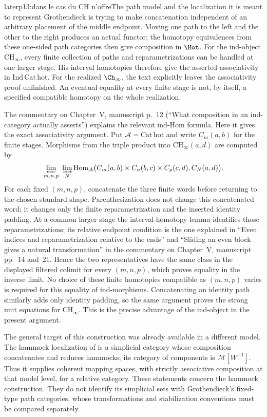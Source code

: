 \begin{dcomment}{later}{p13:dans le cas du CH n'offre}{The path model and the localization it is meant to represent}
Grothendieck is trying to make concatenation independent of an arbitrary placement of the middle endpoint. Moving one path to the left and the other to the right produces an actual functor; the homotopy equivalences from these one-sided path categories then give composition in $\Hot$. For the ind-object $\mathrm{CH}_\infty$, every finite collection of paths and reparametrizations can be handled at one larger stage. His interval homotopies therefore give the asserted associativity in $\mathrm{Ind\,Cat\,hot}$. For the realized $\Ch_\infty$, the text explicitly leaves the associativity proof unfinished. An eventual equality at every finite stage is not, by itself, a specified compatible homotopy on the whole realization.

The commentary on Chapter~V, manuscript p.~12 (``What composition in an ind-category actually asserts'') explains the relevant ind-Hom formula. Here it gives the exact associativity argument. Put $\mathcal A=\mathrm{Cat\,hot}$ and write $C_m(a,b)$ for the finite stages. Morphisms from the triple product into $\mathrm{CH}_\infty(a,d)$ are computed by
\[
 \varprojlim_{m,n,p}\ \varinjlim_N
 \operatorname{Hom}_{\mathcal A}\bigl(
 C_m(a,b)\times C_n(b,c)\times C_p(c,d),C_N(a,d)\bigr).
\]
For each fixed $(m,n,p)$, concatenate the three finite words before returning to the chosen standard shape. Parenthesization does not change this concatenated word; it changes only the finite reparametrization and the inserted identity padding. At a common larger stage the interval-homotopy lemma identifies those reparametrizations; its relative endpoint condition is the one explained in ``Even indices and reparametrization relative to the ends'' and ``Sliding an even block gives a natural transformation'' in the commentary on Chapter~V, manuscript pp.~14 and~21. Hence the two representatives have the same class in the displayed filtered colimit for every $(m,n,p)$, which proves equality in the inverse limit. No choice of these finite homotopies compatible as $(m,n,p)$ varies is required for this equality of ind-morphisms. Concatenating an identity path similarly adds only identity padding, so the same argument proves the strong unit equations for $\mathrm{CH}_\infty$. This is the precise advantage of the ind-object in the present argument.

The general target of this construction was already available in a different model. The hammock localization of \citet[\S2; Propositions 2.2 and 3.1]{DwyerKan1980Calculating} is a simplicial category whose composition concatenates and reduces hammocks; its category of components is $\mathcal M[W^{-1}]$. Thus it supplies coherent mapping spaces, with strictly associative composition at that model level, for a relative category. These statements concern the hammock construction. They do not identify its simplicial sets with Grothendieck's fixed-type path categories, whose transformations and stabilization conventions must be compared separately.


\end{dcomment}
